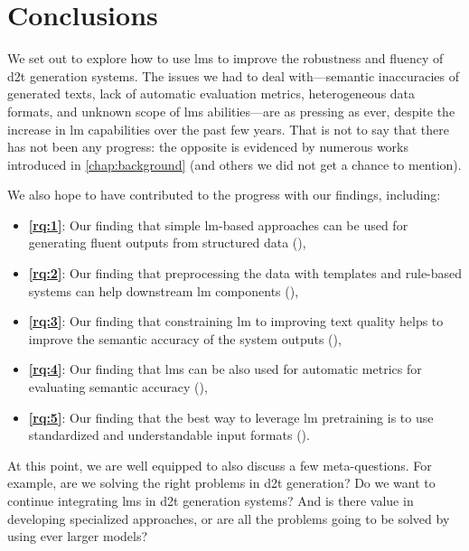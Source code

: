 
\chapter{Conclusions}
\label{chap:conclusions}

We set out to explore how to use \acp{lm} to improve the robustness and fluency of \ac{d2t} generation systems. The issues we had to deal with---semantic inaccuracies of generated texts, lack of automatic evaluation metrics, heterogeneous data formats, and unknown scope of \acp{lm} abilities---are as pressing as ever, despite the increase in \ac{lm} capabilities over the past few years. That is not to say that there has not been any progress: the opposite is evidenced by numerous works introduced in \autoref{chap:background} (and others we did not get a chance to mention).

We also hope to have contributed to the progress with our findings, including:
\begin{itemize}
    \item \textbf{\ref{rq:1}}: Our finding that simple \ac{lm}-based approaches can be used for generating fluent outputs from structured data (),
    \item \textbf{\ref{rq:2}}: Our finding that preprocessing the data with templates and rule-based systems can help downstream \ac{lm} components (),
    \item \textbf{\ref{rq:3}}: Our finding that constraining \ac{lm} to improving text quality helps to improve the semantic accuracy of the system outputs (),
    \item \textbf{\ref{rq:4}}: Our finding that \acp{lm} can be also used for automatic metrics for evaluating semantic accuracy (),
    \item \textbf{\ref{rq:5}}: Our finding that the best way to leverage \ac{lm} pretraining is to use standardized and understandable input formats ().
\end{itemize}

At this point, we are well equipped to also discuss a few meta-questions. For example, are we solving the right problems in \ac{d2t} generation? Do we want to continue integrating \aclp{lm} in \ac{d2t} generation systems? And is there value in developing specialized approaches, or are all the problems going to be solved by using ever larger models?

